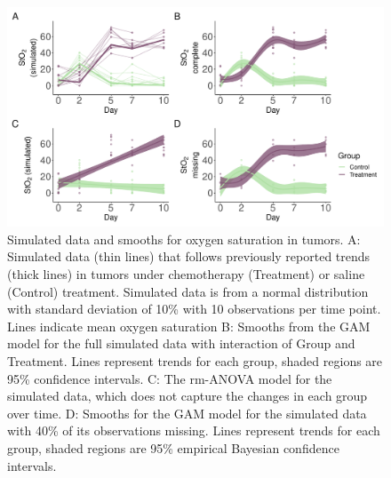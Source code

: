 \documentclass[
]{article}
\begin{document}
\begin{figure}

{\centering \includegraphics[width=1\linewidth]{SIM_Appendix_files/figure-latex/sim-smooth-plot-1} 

}

\caption{Simulated data and smooths for oxygen saturation in tumors. A: Simulated data (thin lines) that follows previously reported trends (thick lines) in tumors under chemotherapy (Treatment) or saline (Control) treatment. Simulated data is from a normal distribution with standard deviation of 10\% with 10 observations per time point. Lines indicate mean oxygen saturation B: Smooths from the GAM model for the full simulated data with interaction of Group and Treatment. Lines represent trends for each group, shaded regions are 95\% confidence intervals. C: The rm-ANOVA model for the simulated data, which does not capture the changes in each group over time. D: Smooths for the GAM model for the simulated data with 40\% of its observations missing. Lines represent trends for each group, shaded regions are 95\% empirical Bayesian confidence intervals.}\label{fig:sim-smooth-plot}
\end{figure}
\end{document}
